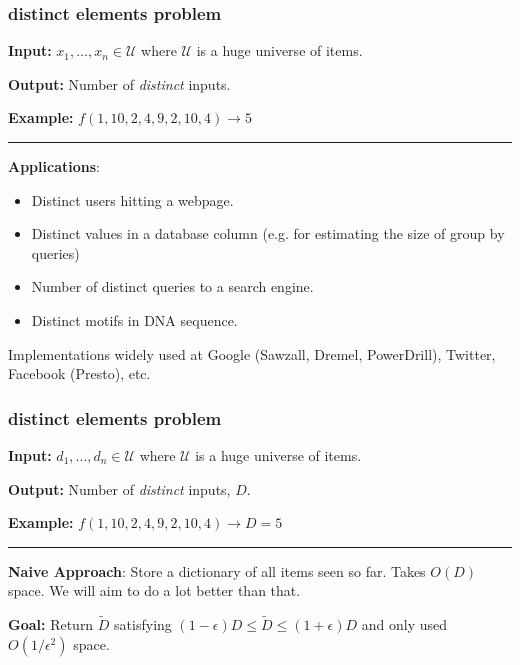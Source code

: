 \documentclass[handout,compress]{beamer}
\begin{document}
\begin{frame}
	\frametitle{distinct elements problem}
	\textbf{Input:} $x_1, \ldots, x_n \in \mathcal{U}$ where $\mathcal{U}$ is a huge universe of items. 
	
	\textbf{Output:} Number of \emph{distinct} inputs.
	
	\textbf{Example:} $f(1, 10, 2, 4, 9, 2, 10, 4) \rightarrow 5$
	
	\vspace{.5em}
	\hrule
	\vspace{.5em}
	
		\textbf{Applications}:
			\begin{itemize}
				\item Distinct users hitting a webpage. 
				\item Distinct values in a database column (e.g. for estimating the size of group by queries)
				\item Number of distinct queries to a search engine.
				\item Distinct motifs in DNA sequence.
			\end{itemize}
		Implementations widely used at Google (Sawzall, Dremel, PowerDrill), Twitter, Facebook (Presto), etc. 
\end{frame}

\begin{frame}[t]
	\frametitle{distinct elements problem}
	\textbf{Input:} $d_1, \ldots, d_n \in \mathcal{U}$ where $\mathcal{U}$ is a huge universe of items. 
	
	\textbf{Output:} Number of \emph{distinct} inputs, $D$.
	
	\textbf{Example:} $f(1, 10, 2, 4, 9, 2, 10, 4) \rightarrow D = 5$
	
	\vspace{.5em}
	\hrule
	\vspace{.5em}
	
	\textbf{Naive Approach}:
	Store a dictionary of all items seen so far. Takes $O(D)$ space. We will aim to do a lot better than that. 
	
	\vspace{1em}
	\textbf{Goal:} Return $\tilde{D}$ satisfying $(1-\epsilon) D \leq \tilde{D} \leq (1+\epsilon) D$ and only used $O(1/\epsilon^2)$ space.

\end{frame}
\end{document}
